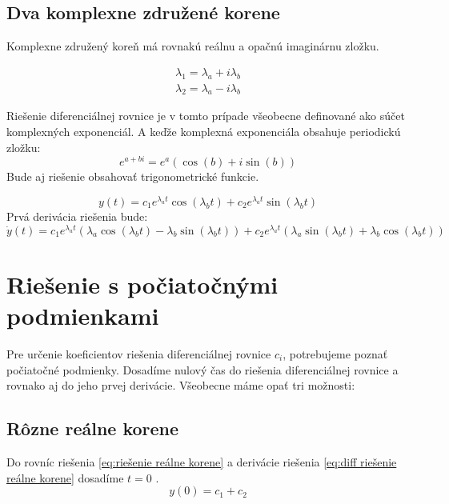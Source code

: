 \documentclass[a4paper,10pt]{article}
\begin{document}
\subsection{Dva komplexne združené korene}

Komplexne združený koreň má rovnakú reálnu a opačnú imaginárnu zložku.

\begin{equation*}
  \begin{array}{l}
  	\lambda_1=\lambda_a+i \lambda_b \\
  	\lambda_2=\lambda_a-i \lambda_b
  \end{array}
\end{equation*}

Riešenie diferenciálnej rovnice je v tomto prípade všeobecne definované ako súčet komplexných exponenciál.
A keďže komplexná exponenciála obsahuje periodickú zložku:
\begin{equation*}
 e^{a+bi}=e^a\left(\cos(b)+i\sin(b)\right)
\end{equation*}
Bude aj riešenie obsahovať trigonometrické funkcie.

\begin{equation}
\label{eq:riešenie komplexné korene}
  y(t)=c_1e^{\lambda_a t}\cos(\lambda_b t)+c_2e^{\lambda_a t}\sin(\lambda_b t)
\end{equation}
Prvá derivácia riešenia bude: 
\begin{equation}
\label{eq:diff riešenie komplexné korene}
 \dot{y}(t)=c_1 e^{\lambda_a t} \left( \lambda_a \cos(\lambda_b t)- \lambda_b \sin(\lambda_b t) \right) +
 c_2 e^{\lambda_a t} \left(\lambda_a \sin(\lambda_b t) + \lambda_b \cos(\lambda_b t)  \right) 
\end{equation}


\section{Riešenie s počiatočnými podmienkami}
Pre určenie koeficientov riešenia diferenciálnej rovnice $c_i$, potrebujeme poznať počiatočné podmienky.
Dosadíme nulový čas do riešenia diferenciálnej rovnice a rovnako aj do jeho prvej derivácie.
Všeobecne máme opať tri možnosti:


\subsection{Rôzne reálne korene}

Do rovníc riešenia \eqref{eq:riešenie reálne korene} a derivácie riešenia \eqref{eq:diff riešenie reálne korene} dosadíme $t=0$ .
\begin{equation}
	y(0)= c_1+c_2
\end{equation}
	
\end{document}
